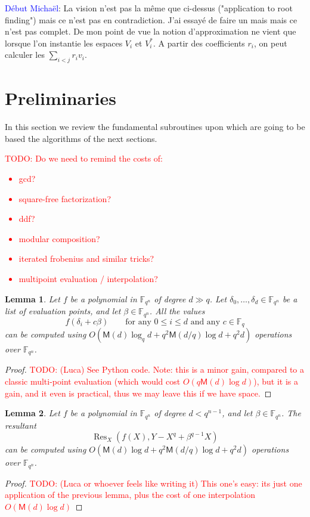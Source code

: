 \documentclass{sig-alternate}
\newcommand{\ff}[1]{\mathbb{F}_{#1}}
\newcommand{\dd}{d}
\newcommand{\qq}{q}
\newcommand{\nn}{n}
\newcommand{\qn}{{\qq^\nn}}
\newcommand{\basef}{\ff{\qq}}
\newcommand{\extf}{\ff{\qn}}
\newcommand{\Mul}{\mathsf{M}}
\DeclareMathOperator{\Res}{Res}
\newcounter{algo}
\newcommand{\todo}[1]{\textcolor{red}{TODO: #1}}
\newcommand{\comd}{\noindent \textcolor{blue}{D\'ebut Micha\"el}:}
\newtheorem{Lem}{Lemma}
\begin{document}
\comd
{\bf }La vision n'est pas la m\^eme que ci-dessus ("application to root finding") mais ce n'est pas en contradiction. J'ai essay\'e de faire un mais mais ce n'est pas complet. De mon point de vue la notion d'approximation ne vient que lorsque l'on instantie les espaces $V_i$ et $V_i^\ast$. A partir des coefficients $r_i$, on peut calculer les $\sum_{i<j} r_i v_i$.

\section{Preliminaries}

In this section we review the fundamental subroutines upon which are
going to be based the algorithms of the next sections.

\todo{Do we need to remind the costs of:
  \begin{itemize}
  \item gcd?
  \item square-free factorization?
  \item ddf?
  \item modular composition?
  \item iterated frobenius and similar tricks?
  \item multipoint evaluation / interpolation?
  \end{itemize}
}

\begin{Lem}
  Let $f$ be a polynomial in $\extf$ of degree $\dd\gg\qq$. Let
  $\delta_0,\dots,\delta_\dd\in\extf$ be a list of evaluation points,
  and let $\beta\in\extf$.  All the values
  \begin{equation*}
    f(\delta_i + c\beta) \qquad\text{for any $0\le i\le d$ and any $c\in\basef$}
  \end{equation*}
  can be computed using $O(\Mul(\dd) \log_\qq\dd +
  \qq^2\Mul(\dd/\qq)\log\dd + \qq^2\dd)$ operations over $\extf$.
\end{Lem}
\begin{proof}
  \todo{(Luca) See Python code. Note: this is a minor gain, compared
    to a classic multi-point evaluation (which would cost
    $O(\qq\Mul(d)\log d)$), but it is a gain, and it even is
    practical, thus we may leave this if we have space.}
\end{proof}

\begin{Lem}
  Let $f$ be a polynomial in $\extf$ of degree $d<\qq^{\nn-1}$, and
  let $\beta\in\extf$. The resultant
  \begin{equation*}
    \Res_X(f(X), Y-X^\qq+\beta^{\qq-1} X)
  \end{equation*}
  can be computed using $O(\Mul(\dd) \log\dd +
  \qq^2\Mul(\dd/\qq)\log\dd + \qq^2\dd)$ operations over $\extf$.
\end{Lem}
\begin{proof}
  \todo{(Luca or whoever feels like writing it) This one's easy: its
    just one application of the previous lemma, plus the cost of one
    interpolation $O(\Mul(d)\log d)$}
\end{proof}
\end{document}
